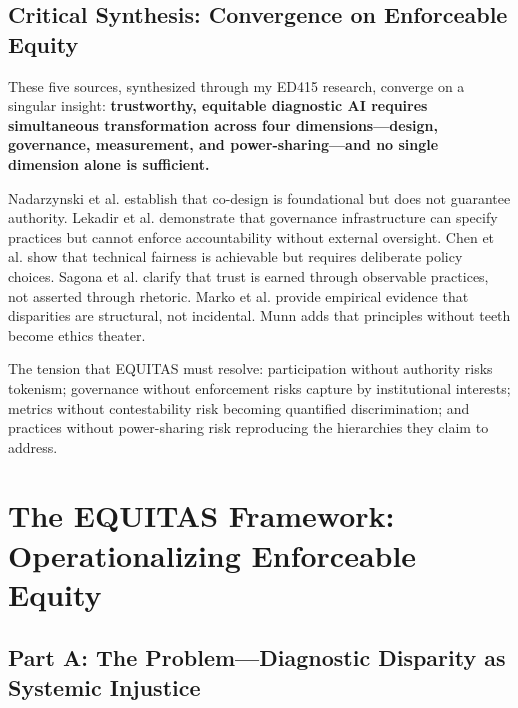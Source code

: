 \documentclass[12pt,a4paper]{article}
\begin{document}
\subsection{Critical Synthesis: Convergence on Enforceable Equity}

\begin{tcolorbox}[colback=noteback,colframe=noteborder,title=\textbf{The Convergence}]
These five sources, synthesized through my ED415 research, converge on a singular insight: \textbf{trustworthy, equitable diagnostic AI requires simultaneous transformation across four dimensions—design, governance, measurement, and power-sharing—and no single dimension alone is sufficient.}

Nadarzynski et al. establish that co-design is foundational but does not guarantee authority.\cite{nadarzynski2024} Lekadir et al. demonstrate that governance infrastructure can specify practices but cannot enforce accountability without external oversight.\cite{lekadir2025} Chen et al. show that technical fairness is achievable but requires deliberate policy choices.\cite{chen2023} Sagona et al. clarify that trust is earned through observable practices, not asserted through rhetoric.\cite{sagona2025} Marko et al. provide empirical evidence that disparities are structural, not incidental.\cite{marko2025} Munn adds that principles without teeth become ethics theater.\cite{munn_idai700}

The tension that EQUITAS must resolve: participation without authority risks tokenism; governance without enforcement risks capture by institutional interests; metrics without contestability risk becoming quantified discrimination; and practices without power-sharing risk reproducing the hierarchies they claim to address.\cite{munn_idai700}
\end{tcolorbox}

\section{The EQUITAS Framework: Operationalizing Enforceable Equity}

\subsection{Part A: The Problem—Diagnostic Disparity as Systemic Injustice}
\end{document}

